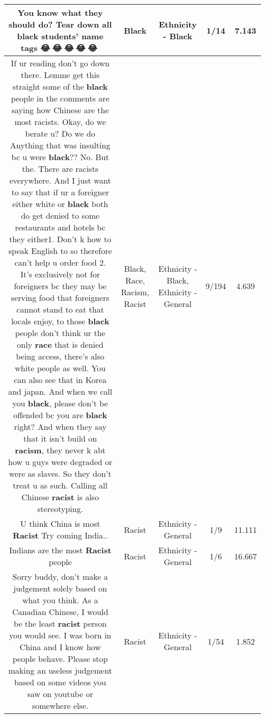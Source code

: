 \documentclass[11pt]{article}
\newlength\mylength
\begin{document}
\begin{center}
\begin{longtable}{|C{.65\mylength}|C{.30\mylength}|C{.12\mylength}|C{.12\mylength}|C{.12\mylength}|}
  \small You know what they should do? Tear down  all \textbf{black} students'  name tags 😂🤣😂🤣😂🤣😂🤣😂🤣\normalsize   & Black & Ethnicity - Black & 1/14 & 7.143 \\  \hline
  \small If ur reading don't go down there. Lemme get this straight some of the \textbf{black} people in the comments are saying how Chinese are the most racists. Okay, do we berate u? Do we do    Anything that was insulting bc u were \textbf{black}?? No. But the. There are racists everywhere. And I just want to say that if ur a foreigner either white or \textbf{black} both do get denied to some restaurants and hotels bc they either1. Don't k how to speak English to so therefore can't help u order food 2. It's exclusively not for foreigners bc they may be serving food that foreigners cannot stand to eat that locals enjoy, to those \textbf{black} people don't think ur the only \textbf{race} that is denied being access, there's also white people as well. You can also see that in Korea and japan. And when we call you \textbf{black}, please don't be offended bc you are \textbf{black} right? And when they say that it isn't build on \textbf{racism}, they never k abt how u guys were degraded or were as slaves. So they don't treat u as such. Calling all Chinese \textbf{racist} is also stereotyping.\normalsize   & Black, Race, Racism, Racist & Ethnicity - Black, Ethnicity - General & 9/194 & 4.639 \\  \hline
  \small U think China is most \textbf{Racist} Try coming India..\normalsize   & Racist & Ethnicity - General & 1/9 & 11.111 \\  \hline
  \small Indians are the most \textbf{Racist} people\normalsize   & Racist & Ethnicity - General & 1/6 & 16.667 \\  \hline
  \small Sorry buddy, don't make a judgement solely based on what you think. As a Canadian Chinese, I would be the least \textbf{racist} person you would see. I was born in China and I know how people behave. Please stop making an useless judgement based on some videos you saw on youtube or somewhere else.\normalsize   & Racist & Ethnicity - General & 1/54 & 1.852 \\  \hline

\end{longtable}
\end{center}
\end{document}
